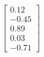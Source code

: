 \documentclass[preview]{standalone}
\begin{document}
\begin{align*}
\begin{bmatrix} 0.12 \\ -0.45 \\ 0.89 \\ 0.03 \\ -0.71 \end{bmatrix}
\end{align*}
\end{document}
